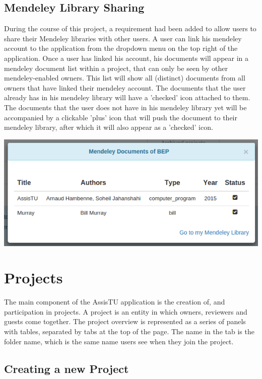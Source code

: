 \newpage

\subsection{Mendeley Library Sharing}

During the course of this project, a requirement had been added to allow users to share their Mendeley libraries with other users. A user can
link his mendeley account to the application from the dropdown menu on the top right of the application. Once a user has linked his account,
his documents will appear in a mendeley document list within a project, that can only be seen by other mendeley-enabled owners. This list will show
all (distinct) documents from all owners that have linked their mendeley account. The documents that the user already has in his mendeley library
will have a 'checked' icon attached to them. The documents that the user does not have in his mendeley library yet will be accompanied by a clickable 
'plus' icon that will push the document to their mendeley library, after which it will also appear as a 'checked' icon.

\begin{center}
\includegraphics[scale=0.5]{./img/mendeley.png}
\end{center}

\section{Projects}

The main component of the AssisTU application is the creation of, and participation in projects. A project is an entity in which owners, reviewers and 
guests come together. 
The project overview is represented as a series of panels with tables, separated by tabs at the top of the page. The name in the tab is the folder 
name, which is the same name users see when they join the project. 

\subsection{Creating a new Project}

